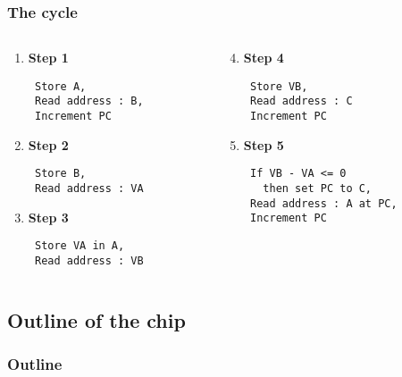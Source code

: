 \documentclass{beamer}
\begin{document}
\begin{frame}[fragile]
    \frametitle{The cycle}

    \begin{columns}[t]
        \begin{column}[T]{5cm}
    \begin{enumerate}
        \item \textbf{Step 1}
            \begin{verbatim}
 Store A,
 Read address : B,
 Increment PC
            \end{verbatim}
        \item \textbf{Step 2}
            \begin{verbatim}
 Store B,
 Read address : VA
            \end{verbatim}

        \item \textbf{Step 3}
            \begin{verbatim}
 Store VA in A,
 Read address : VB
            \end{verbatim}

    \end{enumerate}
\end{column}
\begin{column}[T]{5cm}
    \begin{enumerate}
        \setcounter{enumi}{3}
        \item \textbf{Step 4}
            \begin{verbatim}
 Store VB,
 Read address : C
 Increment PC
            \end{verbatim}

        \item \textbf{Step 5}
            \begin{verbatim}
 If VB - VA <= 0
   then set PC to C,
 Read address : A at PC,
 Increment PC
             \end{verbatim}
    \end{enumerate}
\end{column}
\end{columns}

\end{frame}

\subsection{Outline of the chip}
\begin{frame}
    \frametitle{Outline}
    \centering
    
\end{frame}
\end{document}
